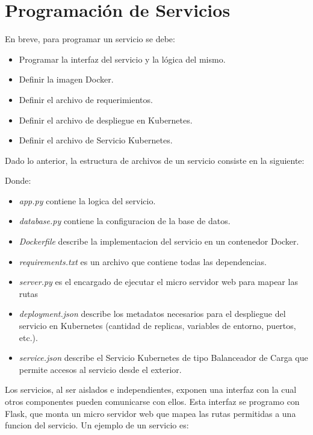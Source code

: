 \section{Programación de Servicios}
En breve, para programar un servicio se debe:
\begin{itemize}
    \item Programar la interfaz del servicio y la lógica del mismo.
    \item Definir la imagen Docker.
    \item Definir el archivo de requerimientos.
    \item Definir el archivo de despliegue en Kubernetes.
    \item Definir el archivo de Servicio Kubernetes.
\end{itemize}
Dado lo anterior, la estructura de archivos de un servicio consiste en la siguiente:
\vspace{0.5cm}

Donde:
\begin{itemize}
\item \textit{app.py} contiene la logica del servicio.
\item \textit{database.py} contiene la configuracion de la base de datos.
\item \textit{Dockerfile} describe la implementacion del servicio en un contenedor Docker.
\item \textit{requirements.txt} es un archivo que contiene todas las dependencias.
\item \textit{server.py} es el encargado de ejecutar el micro servidor web para mapear las rutas 
\item \textit{deployment.json} describe los metadatos necesarios para el despliegue del servicio en Kubernetes (cantidad de replicas, variables de entorno, puertos, etc.).
\item \textit{service.json} describe el Servicio Kubernetes de tipo Balanceador de Carga que permite accesos al servicio desde el exterior.


\end{itemize}

Los servicios, al ser aislados e independientes, exponen una interfaz con la cual otros componentes pueden comunicarse con ellos. Esta interfaz se programo con Flask, que monta un micro servidor web que mapea las rutas permitidas a una funcion del servicio. Un ejemplo de un servicio es:

